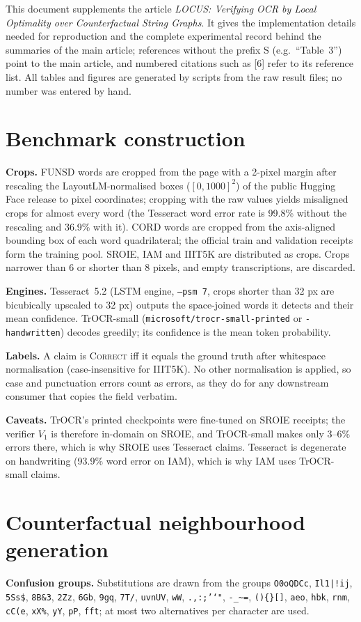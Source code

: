 This document supplements the article \emph{LOCUS: Verifying OCR by Local Optimality over Counterfactual String
Graphs}. It gives the implementation details needed for reproduction and the complete experimental record behind the
summaries of the main article; references without the prefix S (e.g.\ ``Table~3'') point to the main article, and numbered citations such as [6]
refer to its reference list. All
tables and figures are generated by scripts from the raw result files; no number was entered by hand.

\section{Benchmark construction}
\label{app:data}
\textbf{Crops.} FUNSD words are cropped from the page with a 2-pixel margin after rescaling
the LayoutLM-normalised boxes ($[0,1000]^2$) of the public Hugging Face release to pixel coordinates;
cropping with the raw values yields misaligned crops for almost every word (the Tesseract word error
rate is 99.8\% without the rescaling and 36.9\% with it). CORD words are cropped from the axis-aligned
bounding box of each word quadrilateral; the official train and validation receipts form the training
pool. SROIE, IAM and IIIT5K are distributed as crops. Crops narrower than 6 or shorter than 8 pixels,
and empty transcriptions, are discarded.

\textbf{Engines.} Tesseract~5.2 (LSTM engine, \texttt{--psm 7}, crops shorter than 32 px are
bicubically upscaled to 32 px) outputs the space-joined words it detects and their mean confidence.
TrOCR-small (\texttt{microsoft/trocr-small-printed} or \texttt{-handwritten}) decodes greedily; its
confidence is the mean token probability.

\textbf{Labels.} A claim is \textsc{Correct} iff it equals the ground truth after whitespace
normalisation (case-insensitive for IIIT5K). No other normalisation is applied, so case and punctuation
errors count as errors, as they do for any downstream consumer that copies the field verbatim.

\textbf{Caveats.} TrOCR's printed checkpoints were fine-tuned on SROIE receipts; the verifier
$V_1$ is therefore in-domain on SROIE, and TrOCR-small makes only 3--6\% errors there, which is why
SROIE uses Tesseract claims. Tesseract is degenerate on handwriting (93.9\% word error on IAM), which is
why IAM uses TrOCR-small claims.


\section{Counterfactual neighbourhood generation}
\label{app:graph}
\textbf{Confusion groups.} Substitutions are drawn from the groups
\texttt{O0oQDCc}, \texttt{Il1|!ij}, \texttt{5Ss\$}, \texttt{8B\&3}, \texttt{2Zz}, \texttt{6Gb}, \texttt{9gq},
\texttt{7T/}, \texttt{uvnUV}, \texttt{wW}, \texttt{.,:;'`"}, \texttt{-\_\textasciitilde=}, \texttt{()\{\}[]},
\texttt{aeo}, \texttt{hbk}, \texttt{rnm}, \texttt{cC(e}, \texttt{xX\%}, \texttt{yY}, \texttt{pP}, \texttt{fft}; at most two
alternatives per character are used.

